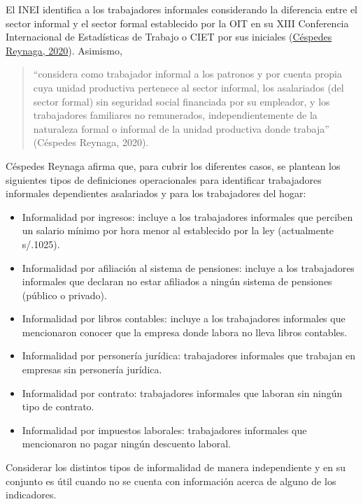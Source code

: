 \documentclass[
  letterpaper,
  12pt,
  oneside,
  spanish,
  doublespacing,
  headsepline,
  parskip]{MastersDoctoralThesis}
\begin{document}
El INEI identifica a los trabajadores informales considerando la
diferencia entre el sector informal y el sector formal establecido por
la OIT en su XIII Conferencia Internacional de Estadísticas de Trabajo o
CIET por sus iniciales
(\protect\hyperlink{ref-cuxe9spedesreynaga2020}{Céspedes Reynaga,
2020}). Asimismo,

\begin{quote}
``considera como trabajador informal a los patronos y por cuenta propia
cuya unidad productiva pertenece al sector informal, los asalariados
(del sector formal) sin seguridad social financiada por su empleador, y
los trabajadores familiares no remunerados, independientemente de la
naturaleza formal o informal de la unidad productiva donde trabaja''
(Céspedes Reynaga, 2020).
\end{quote}

Céspedes Reynaga afirma que, para cubrir los diferentes casos, se
plantean los siguientes tipos de definiciones operacionales para
identificar trabajadores informales dependientes asalariados y para los
trabajadores del hogar:

\begin{itemize}
\item
  Informalidad por ingresos: incluye a los trabajadores informales que
  perciben un salario mínimo por hora menor al establecido por la ley
  (actualmente s/.1025).
\item
  Informalidad por afiliación al sistema de pensiones: incluye a los
  trabajadores informales que declaran no estar afiliados a ningún
  sistema de pensiones (público o privado).
\item
  Informalidad por libros contables: incluye a los trabajadores
  informales que mencionaron conocer que la empresa donde labora no
  lleva libros contables.
\item
  Informalidad por personería jurídica: trabajadores informales que
  trabajan en empresas sin personería jurídica.
\item
  Informalidad por contrato: trabajadores informales que laboran sin
  ningún tipo de contrato.
\item
  Informalidad por impuestos laborales: trabajadores informales que
  mencionaron no pagar ningún descuento laboral.
\end{itemize}

Considerar los distintos tipos de informalidad de manera independiente y
en su conjunto es útil cuando no se cuenta con información acerca de
alguno de los indicadores.
\end{document}
